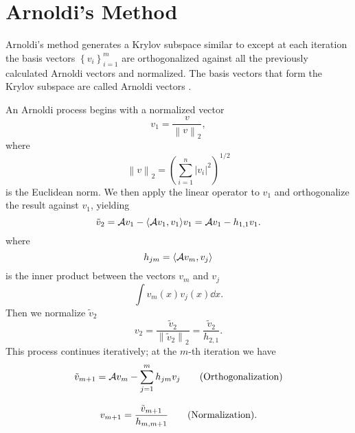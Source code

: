 \section{Arnoldi's Method \label{sec:ArnoldiMethod}}
Arnoldi's method generates a Krylov subspace similar to  except at each iteration the basis vectors $\left\{v_i\right\}_{i=1}^m$ are orthogonalized against all the previously calculated Arnoldi vectors and normalized.  The basis vectors that form the Krylov subspace are called Arnoldi vectors \citep[see][pp. 435-438]{Watkins:2002Funda-0}.

An Arnoldi process begins with a normalized vector
\begin{equation}
    v_1 = \frac{v}{\left\|v\right\|_2},
\end{equation}
where 
\begin{equation}
    \left\|v\right\|_2 = \left(\sum_{i=1}^n\left|v_i\right|^2\right)^{1/2}
\end{equation}
is the Euclidean norm.  We then apply the linear operator to $v_1$ and orthogonalize the result against $v_1$, yielding
\begin{equation}
    \tilde{v}_2 = \mathcal{A} v_1 - \langle\mathcal{A} v_1, v_1\rangle v_1 = \mathcal{A} v_1 - h_{1,1} v_1.
\end{equation}
where
\begin{equation}
    h_{jm} = \langle \mathcal{A} v_m, v_j\rangle
    \label{eq:ArnoldiInnerProduct}
\end{equation}
is the inner product between the vectors $v_m$ and $v_j$ \[\int v_m(x)v_j(x) \dd x.\]  Then we normalize $\tilde{v}_2$
\begin{equation}
    v_2 = \frac{\tilde{v}_2}{\left\|\tilde{v}_2\right\|_2} = \frac{\tilde{v}_2}{h_{2,1}}.
\end{equation}
This process continues iteratively; at the $m$-th iteration we have
\begin{subequations}\begin{gather}
    \tilde{v}_{m+1} = \mathcal{A} v_m - \sum_{j=1}^m h_{jm} v_j \qquad \mathrm{(Orthogonalization)} \label{eq:ArnoldiOrthogonalization} \\[2ex]
    v_{m+1} = \frac{\tilde{v}_{m+1}}{h_{m,m+1}} \qquad \mathrm{(Normalization)}. \label{eq:ArnoldiNormalization}
\end{gather}\end{subequations}


